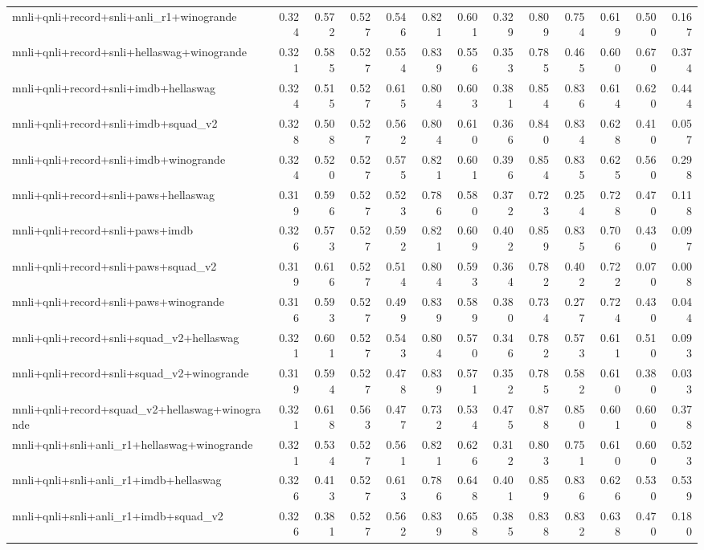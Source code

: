\begin{table}[t]
\begin{tabular}{lrrrrrrrrrrrr}
    mnli+qnli+record+snli+anli\_r1+winogrande & 0.324 & 0.572 & 0.527 & 0.546 & 0.821 & 0.601 & 0.329 & 0.809 & 0.754 & 0.619 & 0.500 & 0.167 \\
    mnli+qnli+record+snli+hellaswag+winogrande & 0.321 & 0.585 & 0.527 & 0.554 & 0.839 & 0.556 & 0.353 & 0.785 & 0.465 & 0.600 & 0.670 & 0.374 \\
    mnli+qnli+record+snli+imdb+hellaswag & 0.324 & 0.515 & 0.527 & 0.615 & 0.804 & 0.603 & 0.381 & 0.854 & 0.836 & 0.614 & 0.620 & 0.444 \\
    mnli+qnli+record+snli+imdb+squad\_v2 & 0.328 & 0.508 & 0.527 & 0.562 & 0.804 & 0.610 & 0.366 & 0.840 & 0.834 & 0.628 & 0.410 & 0.057 \\
    mnli+qnli+record+snli+imdb+winogrande & 0.324 & 0.520 & 0.527 & 0.575 & 0.821 & 0.601 & 0.396 & 0.854 & 0.835 & 0.625 & 0.560 & 0.298 \\
    mnli+qnli+record+snli+paws+hellaswag & 0.319 & 0.596 & 0.527 & 0.523 & 0.786 & 0.580 & 0.372 & 0.723 & 0.254 & 0.728 & 0.470 & 0.118 \\
    mnli+qnli+record+snli+paws+imdb & 0.326 & 0.573 & 0.527 & 0.592 & 0.821 & 0.609 & 0.402 & 0.859 & 0.835 & 0.706 & 0.430 & 0.097 \\
    mnli+qnli+record+snli+paws+squad\_v2 & 0.319 & 0.616 & 0.527 & 0.514 & 0.804 & 0.593 & 0.364 & 0.782 & 0.402 & 0.722 & 0.070 & 0.008 \\
    mnli+qnli+record+snli+paws+winogrande & 0.316 & 0.593 & 0.527 & 0.499 & 0.839 & 0.589 & 0.380 & 0.734 & 0.277 & 0.724 & 0.430 & 0.044 \\
    mnli+qnli+record+snli+squad\_v2+hellaswag & 0.321 & 0.601 & 0.527 & 0.543 & 0.804 & 0.570 & 0.346 & 0.782 & 0.573 & 0.611 & 0.510 & 0.093 \\
    mnli+qnli+record+snli+squad\_v2+winogrande & 0.319 & 0.594 & 0.527 & 0.478 & 0.839 & 0.571 & 0.352 & 0.785 & 0.582 & 0.610 & 0.380 & 0.033 \\
    mnli+qnli+record+squad\_v2+hellaswag+winogrande & 0.321 & 0.618 & 0.563 & 0.477 & 0.732 & 0.534 & 0.475 & 0.878 & 0.850 & 0.601 & 0.600 & 0.378 \\
    mnli+qnli+snli+anli\_r1+hellaswag+winogrande & 0.321 & 0.534 & 0.527 & 0.561 & 0.821 & 0.626 & 0.312 & 0.803 & 0.751 & 0.610 & 0.600 & 0.523 \\
    mnli+qnli+snli+anli\_r1+imdb+hellaswag & 0.326 & 0.413 & 0.527 & 0.613 & 0.786 & 0.648 & 0.401 & 0.859 & 0.836 & 0.626 & 0.530 & 0.539 \\
    mnli+qnli+snli+anli\_r1+imdb+squad\_v2 & 0.326 & 0.381 & 0.527 & 0.562 & 0.839 & 0.658 & 0.385 & 0.838 & 0.832 & 0.638 & 0.470 & 0.180 \\

\end{tabular}
\end{table}

